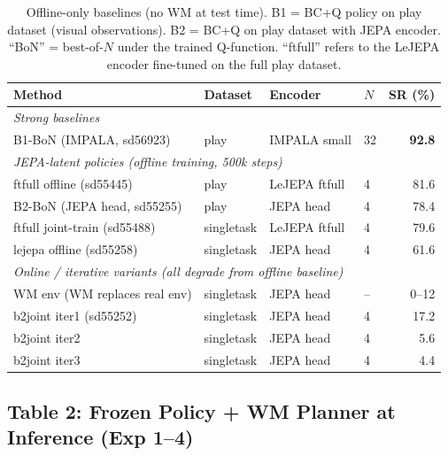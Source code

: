 \documentclass[11pt]{article}
\newcommand{\best}[1]{\textbf{#1}}
\begin{document}
\begin{table}[h]
\centering
\caption{Offline-only baselines (no WM at test time).
  B1 = BC+Q policy on play dataset (visual observations).
  B2 = BC+Q on play dataset with JEPA encoder.
  ``BoN'' = best-of-$N$ under the trained Q-function.
  ``ftfull'' refers to the LeJEPA encoder fine-tuned on the full play dataset.}
\begin{tabular}{llllr}
\toprule
Method & Dataset & Encoder & $N$ & SR (\%) \\
\midrule
\multicolumn{5}{l}{\textit{Strong baselines}} \\
B1-BoN (IMPALA, sd56923)     & play       & IMPALA small  & 32 & \best{92.8} \\
\midrule
\multicolumn{5}{l}{\textit{JEPA-latent policies (offline training, 500k steps)}} \\
ftfull offline (sd55445)      & play       & LeJEPA ftfull &  4 & 81.6 \\
B2-BoN (JEPA head, sd55255)   & play       & JEPA head     &  4 & 78.4 \\
ftfull joint-train (sd55488)  & singletask & LeJEPA ftfull &  4 & 79.6 \\
lejepa offline (sd55258)      & singletask & JEPA head     &  4 & 61.6 \\
\midrule
\multicolumn{5}{l}{\textit{Online / iterative variants (all degrade from offline baseline)}} \\
WM env (WM replaces real env)  & singletask & JEPA head    & -- &  0--12 \\
b2joint iter1 (sd55252)        & singletask & JEPA head    &  4 & 17.2 \\
b2joint iter2                  & singletask & JEPA head    &  4 &  5.6 \\
b2joint iter3                  & singletask & JEPA head    &  4 &  4.4 \\
\bottomrule
\end{tabular}
\end{table}

\subsection*{Table 2: Frozen Policy + WM Planner at Inference (Exp 1--4)}
\end{document}
